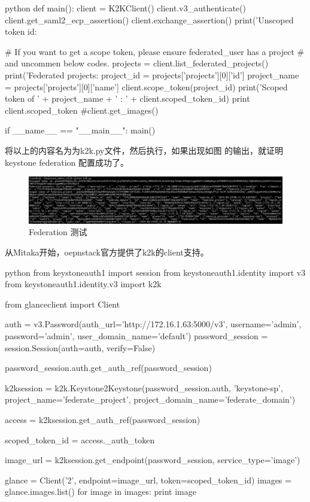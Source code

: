 \begin{code-block}{python}
def main():
    client = K2KClient()
    client.v3_authenticate()
    client.get_saml2_ecp_assertion()
    client.exchange_assertion()
    print('Unscoped token id: %

    # If you want to get a scope token, please ensure federated_user has a project
    # and uncommen below codes.
    projects = client.list_federated_projects()
    print('Federated projects: %
    project_id = projects['projects'][0]['id']
    project_name = projects['projects'][0]['name']
    client.scope_token(project_id)
    print('Scoped token of ' + project_name + ' : ' + client.scoped_token_id)
    print client.scoped_token
    #client.get_images()


if __name__ == "__main__":
    main()
\end{code-block}
将以上的内容名为为k2k.py文件，然后执行，如果出现如图 的输出，就证明keystone federation
配置成功了。
\begin{figure}[H]
  \centering
  \includegraphics[scale=0.20]{k2k_result.png}
  \caption{Federation 测试}
  \label{fig:k2k_result}
\end{figure}

从Mitaka开始，oepnstack官方提供了k2k的client支持。
\begin{code-block}{python}
from keystoneauth1 import session
from keystoneauth1.identity import v3
from keystoneauth1.identity.v3 import k2k

from glanceclient import Client

auth = v3.Password(auth_url='http://172.16.1.63:5000/v3',
                   username='admin',
                   password='admin',
                   user_domain_name='default')
password_session = session.Session(auth=auth, verify=False)

password_session.auth.get_auth_ref(password_session)

k2ksession = k2k.Keystone2Keystone(password_session.auth,
    'keystone-sp', project_name='federate_project',
    project_domain_name='federate_domain')

access = k2ksession.get_auth_ref(password_session)

scoped_token_id = access._auth_token

image_url = k2ksession.get_endpoint(password_session,
                                    service_type='image')

glance = Client('2', endpoint=image_url, token=scoped_token_id)
images = glance.images.list()
for image in images:
    print image
\end{code-block}

